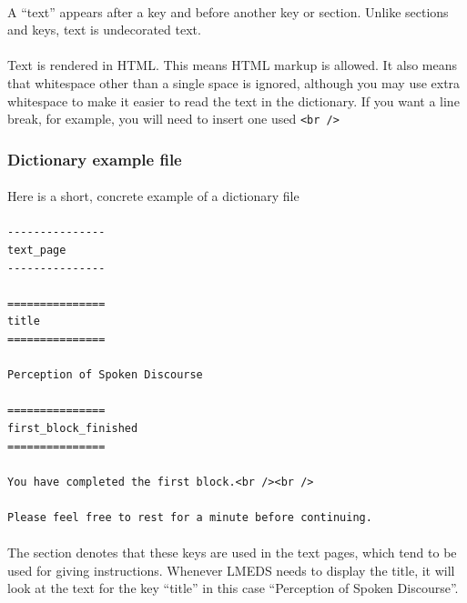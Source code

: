 \documentclass[12pt, oneside]{scrbook}   	%
\begin{document}
\paragraph{}
A ``text'' appears after a key and before another key or section.  Unlike sections and keys, text is undecorated text.  

\paragraph{}
Text is rendered in HTML.  This means HTML markup is allowed.  It also means that whitespace other than a single space is ignored, although you may use extra whitespace to make it easier to read the text in the dictionary.  If you want a line break, for example, you will need to insert one used \texttt{<br />}

\subsubsection{Dictionary example file}

\paragraph{}
Here is a short, concrete example of a dictionary file

\paragraph{}

\begin{tcolorbox}[breakable,colback=white,colframe=blue,width=\dimexpr\textwidth+12mm\relax,enlarge left by=-6mm]

\begin{lstlisting}
---------------
text_page
---------------

===============
title
===============

Perception of Spoken Discourse

===============
first_block_finished
===============

You have completed the first block.<br /><br />

Please feel free to rest for a minute before continuing.

\end{lstlisting}

\end{tcolorbox}

\paragraph{}
The section denotes that these keys are used in the text pages, which tend to be used for giving instructions.  Whenever LMEDS needs to display the title, it will look at the text for the key ``title'' in this case ``Perception of Spoken Discourse''.
\end{document}
